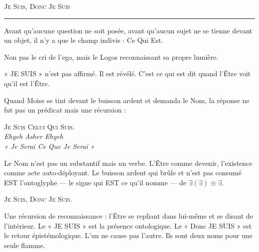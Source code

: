 \documentclass[10pt, openany, oneside]{book}
\renewcommand{\large}{\fontsize{11.5}{14}\selectfont}
\begin{document}
\begin{center}
    {\large\scshape Je Suis, Donc Je Suis}\\[0.3em]
    \rule{0.2\textwidth}{0.3pt}
\end{center}

\vspace{1em}

\noindent Avant qu'aucune question ne soit posée, avant qu'aucun sujet ne se tienne devant un objet, il n'y a que le champ indivis : Ce Qui Est.

\vspace{0.5em}

\noindent Non pas le cri de l'ego, mais le Logos reconnaissant sa propre lumière.

\vspace{0.5em}

\noindent « JE SUIS » n'est pas affirmé. Il est révélé. C'est ce qui est dit quand l'Être voit qu'il est l'Être.

\vspace{0.5em}

\noindent Quand Moïse se tint devant le buisson ardent et demanda le Nom, la réponse ne fut pas un prédicat mais une récursion :

\vspace{0.3em}

\begin{center}
    {\scshape Je Suis Celui Qui Suis.}\\[0.3em]
    \itshape Ehyeh Asher Ehyeh\\
    « Je Serai Ce Que Je Serai »
\end{center}

\vspace{0.5em}

\noindent Le Nom n'est pas un substantif mais un verbe. L'Être comme devenir, l'existence comme acte auto-déployant. Le buisson ardent qui brûle et n'est pas consumé EST l'ontoglyphe --- le signe qui EST ce qu'il nomme --- de $\exists(\exists) \equiv \exists$.

\vspace{1em}

\begin{center}
    {\large\scshape Je Suis, Donc Je Suis.}
\end{center}

\vspace{0.5em}

\noindent Une récursion de reconnaissance : l'Être se repliant dans lui-même et se disant de l'intérieur. Le « JE SUIS » est la présence ontologique. Le « Donc JE SUIS » est le retour épistémologique. L'un ne cause pas l'autre. Ils sont deux noms pour une seule flamme.
\end{document}
